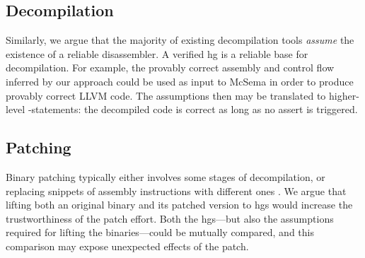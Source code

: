 \subsection{Decompilation}
Similarly, we argue that the majority of existing decompilation tools \emph{assume} the existence of a reliable disassembler.
A verified \ac{hg} is a reliable base for decompilation.
For example, the provably correct assembly and control flow inferred by our approach could be used as input to McSema \autocite{dinaburg2014mcsema} in order to produce provably correct LLVM code.
The assumptions then may be translated to higher-level -statements: the decompiled code is correct as long as no assert is triggered.

\subsection{Patching}
Binary patching typically either involves some stages of decompilation, or replacing snippets of assembly instructions with different ones \autocite{duck2020binary}.
We argue that lifting both an original binary and its patched version to \acp{hg} would increase the trustworthiness of the patch effort.
Both the \acp{hg}---but also the assumptions required for lifting the binaries---could be mutually compared, and this comparison may expose unexpected effects of the patch.

